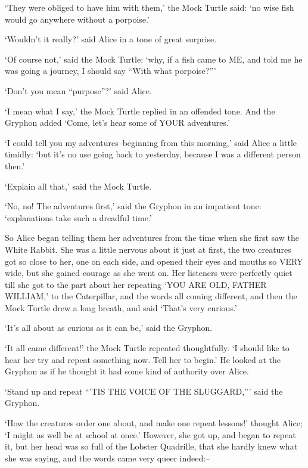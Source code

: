 \documentclass[12pt]{book}
\begin{document}
  `They were obliged to have him with them,' the Mock Turtle
said:  `no wise fish would go anywhere without a porpoise.'

  `Wouldn't it really?' said Alice in a tone of great surprise.

  `Of course not,' said the Mock Turtle:  `why, if a fish came
to ME, and told me he was going a journey, I should say ``With
what porpoise?'''

  `Don't you mean ``purpose''?' said Alice.

  `I mean what I say,' the Mock Turtle replied in an offended
tone.  And the Gryphon added `Come, let's hear some of YOUR
adventures.'

  `I could tell you my adventures--beginning from this morning,'
said Alice a little timidly:  `but it's no use going back to
yesterday, because I was a different person then.'

  `Explain all that,' said the Mock Turtle.

  `No, no!  The adventures first,' said the Gryphon in an
impatient tone:  `explanations take such a dreadful time.'

  So Alice began telling them her adventures from the time when
she first saw the White Rabbit.  She was a little nervous about
it just at first, the two creatures got so close to her, one on
each side, and opened their eyes and mouths so VERY wide, but she
gained courage as she went on.  Her listeners were perfectly
quiet till she got to the part about her repeating `YOU ARE OLD,
FATHER WILLIAM,' to the Caterpillar, and the words all coming
different, and then the Mock Turtle drew a long breath, and said
`That's very curious.'

  `It's all about as curious as it can be,' said the Gryphon.

  `It all came different!' the Mock Turtle repeated
thoughtfully.  `I should like to hear her try and repeat
something now.  Tell her to begin.'  He looked at the Gryphon as
if he thought it had some kind of authority over Alice.

  `Stand up and repeat ``'TIS THE VOICE OF THE SLUGGARD,''' said
the Gryphon.

  `How the creatures order one about, and make one repeat
lessons!' thought Alice; `I might as well be at school at once.'
However, she got up, and began to repeat it, but her head was so
full of the Lobster Quadrille, that she hardly knew what she was
saying, and the words came very queer indeed:--
\end{document}
